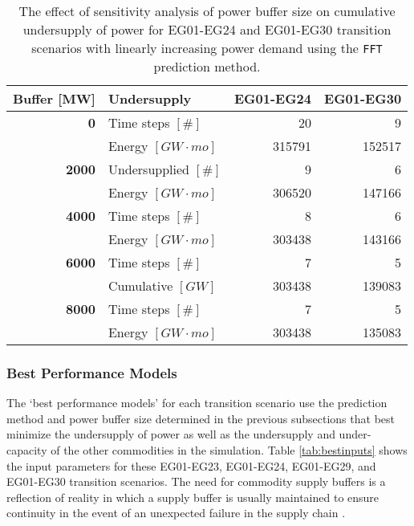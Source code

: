 \begin{table}[]
	\centering
	\caption{The effect of sensitivity analysis of power buffer size on cumulative 
	undersupply of power for EG01-EG24 and EG01-EG30 transition scenarios with linearly 
	increasing power demand using the \texttt{FFT} prediction method.}
	\label{tab:buff_size}
		\begin{tabular}{r|lrr}
                \hline
        \textbf{Buffer [MW]}     & \textbf{Undersupply}             & \textbf{EG01-EG24}   & \textbf{EG01-EG30} \\
		\hline
		\textbf{0}             & Time steps $[\#]$ & 20 & 9\\  
                      & Energy $[GW\cdot mo]$    & 315791 & 152517 \\ \hline
		\textbf{2000}          & Undersupplied $[\#]$ & 9 & 6 \\  
        	      & Energy $[GW\cdot mo]$    & 306520 & 147166 \\ \hline
        \textbf{4000}          & Time steps $[\#]$ & 8 & 6 \\  
				  & Energy $[GW\cdot mo]$    & 303438 & 143166 \\ \hline
		\textbf{6000}          & Time steps $[\#]$ & 7 & 5 \\  
		& Cumulative $[GW]$    & 303438 & 139083 \\ \hline
        \textbf{8000}          & Time steps $[\#]$ & 7 & 5  \\  
	              & Energy $[GW\cdot mo]$    & 303438 & 135083 \\ \hline
	\end{tabular}
\end{table}

\subsubsection{Best Performance Models}
\label{sec:complex3}
The `best performance models' for each transition scenario use the prediction 
method and power buffer size determined in the previous subsections that best  
minimize the undersupply of power as well as the
undersupply and under-capacity of the other commodities
in the simulation.
Table \ref{tab:bestinputs} shows the \deploy input parameters for these
EG01-EG23, EG01-EG24, EG01-EG29, and EG01-EG30 transition scenarios. 
The need for commodity supply buffers is a reflection of reality
in which a supply buffer is usually maintained to ensure 
continuity in the event of an unexpected failure in the supply chain
\cite{united_nations_institute_for_disarmament_research_multilateralization_2013}.

